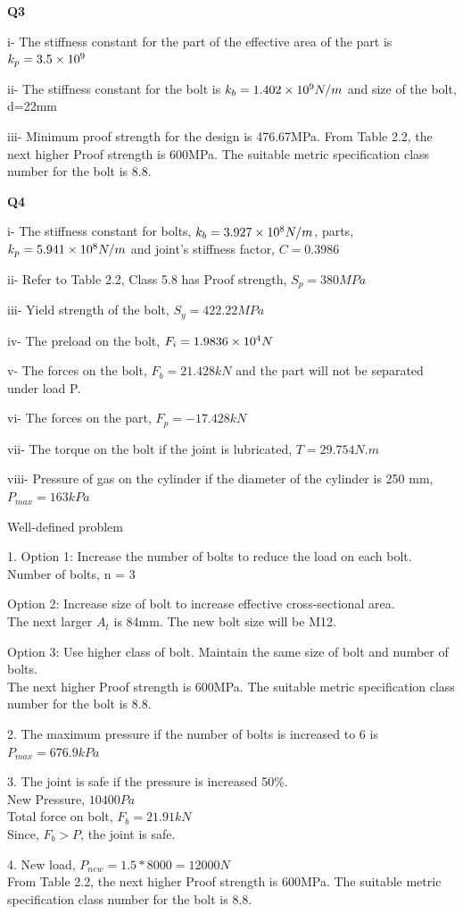 \documentclass[a4paper, fleqn]{article}
\providecommand{\sci}[1]{\protect\ensuremath{\times 10^{\StrSubstitute[0]{#1}{e}{}}}}
\begin{document}
\vspace{10pt}
\textbf{Q3}

i- The stiffness constant for the part of the effective area of the part is $k_p=3.5\sci{e9}$

ii- The stiffness constant for the bolt is $k_b=1.402\sci{e9}N/m$ and size of the bolt, d=22mm

iii- Minimum proof strength for the design is 476.67MPa.
From Table 2.2, the next higher Proof strength is 600MPa. The suitable metric specification class number for the bolt is 8.8.

\vspace{10pt}
\textbf{Q4}


i- The stiffness constant for bolts, $k_b=3.927\sci{e8}N/m$, parts, $k_p=5.941\sci{e8}N/m$ and joint’s stiffness factor, $C=0.3986$

ii- Refer to Table 2.2, Class 5.8 has Proof strength, $S_p=380MPa$

iii- Yield strength of the bolt, $S_y=422.22MPa$

iv- The preload on the bolt, $F_i=1.9836\sci{e4}N$

v- The forces on the bolt, $F_b=21.428kN$ and the part will not be separated under load P.

vi- The forces on the part, $F_p=-17.428kN$

vii- The torque on the bolt if the joint is lubricated, $T=29.754N.m$

viii- Pressure of gas on the cylinder if the diameter of the cylinder is 250 mm, $P_{max}=163kPa$

\vspace{10pt}
Well-defined problem

1. Option 1: Increase the number of bolts to reduce the load on each bolt.
Number of bolts, n = 3

Option 2: Increase size of bolt to increase effective cross-sectional area. \\
The next larger $A_t$ is 84mm. The new bolt size will be M12.

Option 3: Use higher class of bolt. Maintain the same size of bolt and number of bolts. \\
The next higher Proof strength is 600MPa. The suitable metric specification class number for the bolt is 8.8.

2. The maximum pressure if the number of bolts is increased to 6 is $P_{max}=676.9kPa$

3. The joint is safe if the pressure is increased 50\%. \\
New Pressure, $10400Pa$ \\
Total force on bolt, $F_b=21.91kN$ \\
Since, $F_b >P$, the joint is safe.

4. New load, $P_{new}=1.5*8000=12000N$ \\
From Table 2.2, the next higher Proof strength is 600MPa.
The suitable metric specification class number for the bolt is 8.8.
\end{document}
